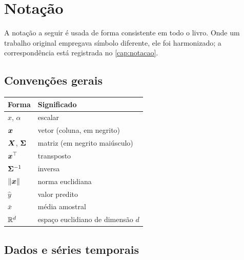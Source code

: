 \chapter*{Notação}
\label{cap:notacao-front}

A notação a seguir é usada de forma consistente em todo o livro. Onde um trabalho
original empregava símbolo diferente, ele foi harmonizado; a correspondência está
registrada no \cref{cap:notacao}.

\section*{Convenções gerais}

\begin{center}
\begin{tabular}{ll}
\toprule
\textbf{Forma} & \textbf{Significado} \\
\midrule
$x$, $\alpha$              & escalar \\
$\bm{x}$                 & vetor (coluna, em negrito) \\
$\bm{X}$, $\bm{\Sigma}$  & matriz (em negrito maiúsculo) \\
$\bm{x}^{\top}$          & transposto \\
$\bm{\Sigma}^{-1}$        & inversa \\
$\|\bm{x}\|$             & norma euclidiana \\
$\hat{y}$                  & valor predito \\
$\bar{x}$                  & média amostral \\
$\mathbb{R}^{d}$                   & espaço euclidiano de dimensão $d$ \\
\bottomrule
\end{tabular}
\end{center}

\section*{Dados e séries temporais}

